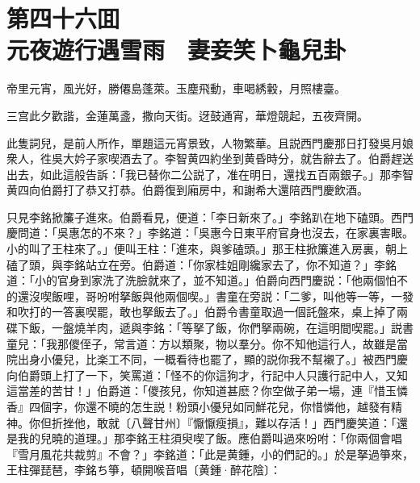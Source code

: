 
\chapter*{第四十六囬　\\元夜遊行遇雪雨　妻妾笑卜龜兒卦}


\begin{myquote}
帝里元宵，風光好，勝僊島蓬萊。玉塵飛動，車喝綉轂，月照樓臺。

三宫此夕歡諧，金蓮萬盞，撒向天街。迓鼓通宵，華燈競起，五夜齊開。
\end{myquote}

此隻詞兒，是前人所作，單題這元宵景致，人物繁華。且説西門慶那日打發吳月娘衆人，徃吳大妗子家喫酒去了。李智黄四約坐到黄昏時分，就告辭去了。伯爵趕送出去，如此這般告訴：「我已替你二公説了，准在明日，還找五百兩銀子。」那李智黄四向伯爵打了恭又打恭。伯爵復到廂房中，和謝希大還陪西門慶飲酒。

只見李銘掀簾子進來。伯爵看見，便道：「李日新來了。」李銘趴在地下磕頭。西門慶問道：「吳惠怎的不來？」李銘道：「吳惠今日東平府官身也沒去，在家裏害眼。小的叫了王柱來了。」便叫王柱：「進來，與爹磕頭。」那王柱掀簾進入房裏，朝上磕了頭，與李銘站立在旁。伯爵道：「你家桂姐剛纔家去了，你不知道？」李銘道：「小的官身到家洗了洗臉就來了，並不知道。」伯爵向西門慶説：「他兩個怕不的還沒喫飯哩，哥吩咐拏飯與他兩個喫。」書童在旁説：「二爹，叫他等一等，一發和吹打的一答裏喫罷，敢也拏飯去了。」伯爵令書童取過一個託盤來，桌上掉了兩碟下飯，一盤燒羊肉，遞與李銘：「等拏了飯，你們拏兩碗，在這明間喫罷。」説書童兒：「我那儍侄子，常言道：方以類聚，物以羣分。你不知他這行人，故雖是當院出身小優兒，比楽工不同，一概看待也罷了，顯的説你我不幫襯了。」被西門慶向伯爵頭上打了一下，笑罵道：「怪不的你這狗才，行記中人只護行記中人，又知這當差的苦甘！」伯爵道：「儍孩兒，你知道甚麽？你空做子弟一場，連『惜玉憐香』四個字，你還不曉的怎生説！粉頭小優兒如同鮮花兒，你惜憐他，越發有精神。你但折挫他，敢就〔八聲甘州〕『懨懨瘦損』，難以存活！」西門慶笑道：「還是我的兒曉的道理。」那李銘王柱須臾喫了飯。應伯爵叫過來吩咐：「你兩個會唱『雪月風花共裁剪』不會？」李銘道：「此是黄鍾，小的們記的。」於是拏過箏來，王柱彈琵琶，李銘ち箏，頓開喉音唱〔黄鍾·醉花陰〕：


